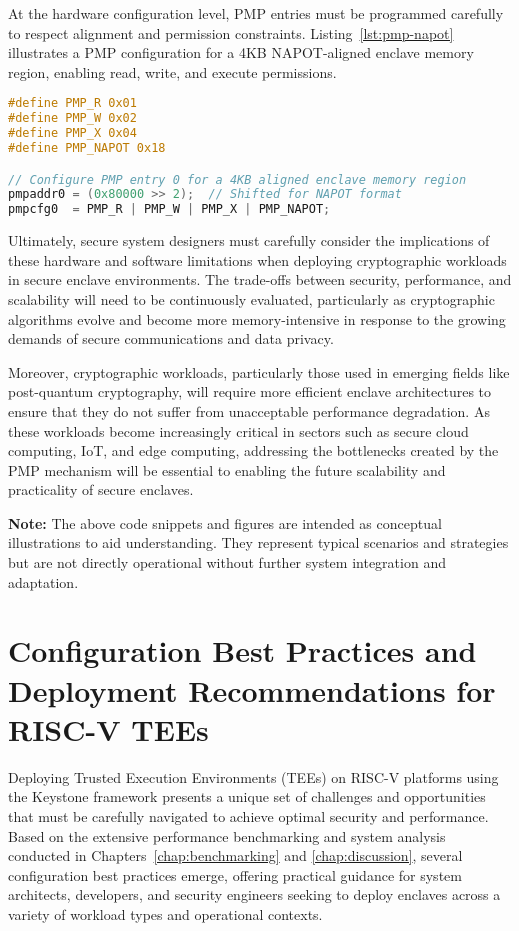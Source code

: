 At the hardware configuration level, PMP entries must be programmed carefully to respect alignment and permission constraints. Listing~\ref{lst:pmp-napot} illustrates a PMP configuration for a 4KB NAPOT-aligned enclave memory region, enabling read, write, and execute permissions.

\begin{lstlisting}[language=C, caption={Example PMP configuration for a NAPOT-aligned memory region.}, label={lst:pmp-napot}]
#define PMP_R 0x01
#define PMP_W 0x02
#define PMP_X 0x04
#define PMP_NAPOT 0x18

// Configure PMP entry 0 for a 4KB aligned enclave memory region
pmpaddr0 = (0x80000 >> 2);  // Shifted for NAPOT format
pmpcfg0  = PMP_R | PMP_W | PMP_X | PMP_NAPOT;
\end{lstlisting}

Ultimately, secure system designers must carefully consider the implications of these hardware and software limitations when deploying cryptographic workloads in secure enclave environments. The trade-offs between security, performance, and scalability will need to be continuously evaluated, particularly as cryptographic algorithms evolve and become more memory-intensive in response to the growing demands of secure communications and data privacy.

Moreover, cryptographic workloads, particularly those used in emerging fields like post-quantum cryptography, will require more efficient enclave architectures to ensure that they do not suffer from unacceptable performance degradation. As these workloads become increasingly critical in sectors such as secure cloud computing, IoT, and edge computing, addressing the bottlenecks created by the PMP mechanism will be essential to enabling the future scalability and practicality of secure enclaves.

\textbf{Note:} The above code snippets and figures are intended as conceptual illustrations to aid understanding. They represent typical scenarios and strategies but are not directly operational without further system integration and adaptation.

\section{Configuration Best Practices and Deployment Recommendations for RISC-V TEEs}
\label{sec:best-practices}
Deploying Trusted Execution Environments (TEEs) on RISC-V platforms using the Keystone framework presents a unique set of challenges and opportunities that must be carefully navigated to achieve optimal security and performance. Based on the extensive performance benchmarking and system analysis conducted in Chapters~\ref{chap:benchmarking} and \ref{chap:discussion}, several configuration best practices emerge, offering practical guidance for system architects, developers, and security engineers seeking to deploy enclaves across a variety of workload types and operational contexts.

